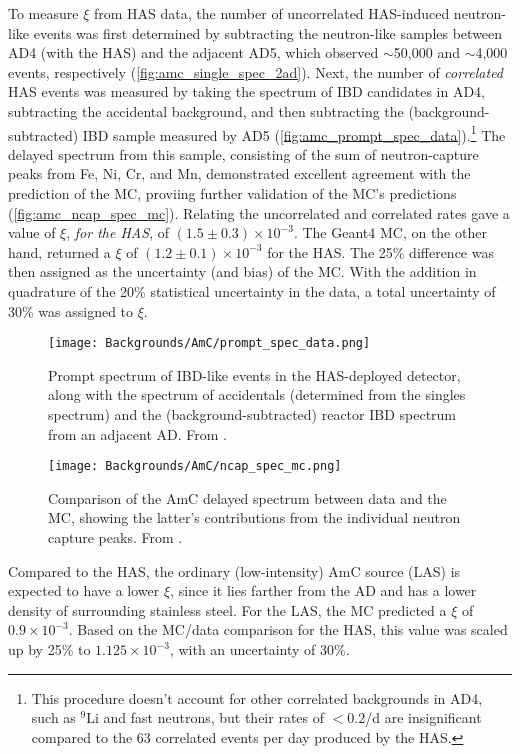 \documentclass[../thesis.tex]{subfiles}
\begin{document}
To measure $\xi$ from HAS data, the number of uncorrelated HAS-induced neutron-like events was first determined by subtracting the neutron-like samples between AD4 (with the HAS) and the adjacent AD5, which observed $\sim$50,000 and $\sim$4,000 events, respectively (\autoref{fig:amc_single_spec_2ad}). Next, the number of \emph{correlated} HAS events was measured by taking the spectrum of IBD candidates in AD4, subtracting the accidental background, and then subtracting the (background-subtracted) IBD sample measured by AD5 (\autoref{fig:amc_prompt_spec_data}).\footnote{This procedure doesn't account for other correlated backgrounds in AD4, such as $^9$Li and fast neutrons, but their rates of $< 0.2$/d are insignificant compared to the 63 correlated events per day produced by the HAS.} The delayed spectrum from this sample, consisting of the sum of neutron-capture peaks from Fe, Ni, Cr, and Mn, demonstrated excellent agreement with the prediction of the MC, proviing further validation of the MC's predictions (\autoref{fig:amc_ncap_spec_mc}). Relating the uncorrelated and correlated rates gave a value of $\xi$, \emph{for the HAS}, of $(1.5\pm0.3)\times10^{-3}$. The Geant4 MC, on the other hand, returned a $\xi$ of $(1.2\pm0.1)\times10^{-3}$ for the HAS. The 25\% difference was then assigned as the uncertainty (and bias) of the MC. With the addition in quadrature of the 20\% statistical uncertainty in the data, a total uncertainty of 30\% was assigned to $\xi$.

\begin{figure}[ht]
  \texttt{[image: Backgrounds/AmC/prompt\_spec\_data.png]}
  \caption{Prompt spectrum of IBD-like events in the HAS-deployed detector, along with the spectrum of accidentals (determined from the singles spectrum) and the (background-subtracted) reactor IBD spectrum from an adjacent AD. From \cite{Gu_2016}.}
  \label{fig:amc_prompt_spec_data}
\end{figure}

\begin{figure}[ht]
  \texttt{[image: Backgrounds/AmC/ncap\_spec\_mc.png]}
  \caption{Comparison of the AmC delayed spectrum between data and the MC, showing the latter's contributions from the individual neutron capture peaks. From \cite{Gu_2016}.}
  \label{fig:amc_ncap_spec_mc}
\end{figure}

Compared to the HAS, the ordinary (low-intensity) AmC source (LAS) is expected to have a lower $\xi$, since it lies farther from the AD and has a lower density of surrounding stainless steel. For the LAS, the MC predicted a $\xi$ of $0.9\times10^{-3}$. Based on the MC/data comparison for the HAS, this value was scaled up by 25\% to $1.125\times10^{-3}$, with an uncertainty of 30\%. 
\end{document}
